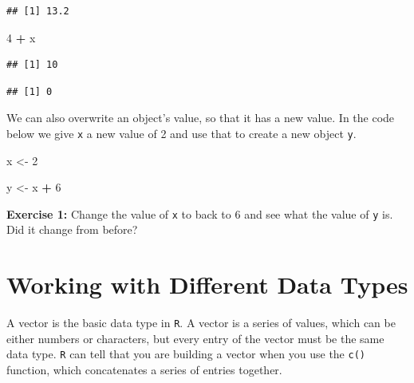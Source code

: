 \documentclass[]{article}
\newenvironment{Shaded}{\begin{snugshade}}{\end{snugshade}}
\newcommand{\DecValTok}[1]{\textcolor[rgb]{0.00,0.00,0.81}{#1}}
\newcommand{\StringTok}[1]{\textcolor[rgb]{0.31,0.60,0.02}{#1}}
\newcommand{\OperatorTok}[1]{\textcolor[rgb]{0.81,0.36,0.00}{\textbf{#1}}}
\newcommand{\NormalTok}[1]{#1}
\begin{document}
\begin{verbatim}
## [1] 13.2
\end{verbatim}

\begin{Shaded}
\begin{Highlighting}[]
\DecValTok{4} \OperatorTok{+}\StringTok{ }\NormalTok{x}
\end{Highlighting}
\end{Shaded}

\begin{verbatim}
## [1] 10
\end{verbatim}

\begin{Shaded}
\end{Shaded}

\begin{verbatim}
## [1] 0
\end{verbatim}

\vspace{0.25cm}

We can also overwrite an object's value, so that it has a new value. In
the code below we give \texttt{x} a new value of 2 and use that to
create a new object \texttt{y}.

\vspace{0.25cm}

\begin{Shaded}
\begin{Highlighting}[]
\NormalTok{x <-}\StringTok{ }\DecValTok{2}

\NormalTok{y <-}\StringTok{ }\NormalTok{x }\OperatorTok{+}\StringTok{ }\DecValTok{6}
\end{Highlighting}
\end{Shaded}

\vspace{0.25cm}

\textbf{Exercise 1:} Change the value of \texttt{x} to back to 6 and see
what the value of \texttt{y} is. Did it change from before?

\section{Working with Different Data
Types}\label{working-with-different-data-types}

A vector is the basic data type in \texttt{R}. A vector is a series of
values, which can be either numbers or characters, but every entry of
the vector must be the same data type. \texttt{R} can tell that you are
building a vector when you use the \texttt{c()} function, which
concatenates a series of entries together.
\end{document}
